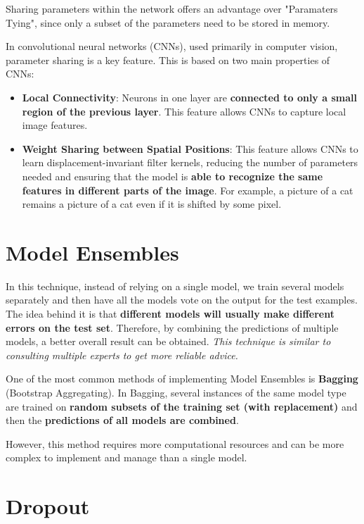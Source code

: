 Sharing parameters within the network offers an advantage over "Paramaters Tying", since only a subset of the parameters need to be stored in memory.

In convolutional neural networks (CNNs), used primarily in computer vision, parameter sharing is a key feature. This is based on two main properties of CNNs:

\begin{itemize}
    \item \textbf{Local Connectivity}: Neurons in one layer are \textbf{connected to only a small region of the previous layer}. This feature allows CNNs to capture local image features.
    \item \textbf{Weight Sharing between Spatial Positions}: This feature allows CNNs to learn displacement-invariant filter kernels, reducing the number of parameters needed and ensuring that the model is \textbf{able to recognize the same features in different parts of the image}. For example, a picture of a cat remains a picture of a cat even if it is shifted by some pixel. 
\end{itemize}

\section{Model Ensembles}

In this technique, instead of relying on a single model, we train several models separately and then have all the models vote on the output for the test examples. The idea behind it is that \textbf{different models will usually make different errors on the test set}. Therefore, by combining the predictions of multiple models, a better overall result can be obtained. \textit{This technique is similar to consulting multiple experts to get more reliable advice.}

One of the most common methods of implementing Model Ensembles is \textbf{Bagging} (Bootstrap Aggregating). In Bagging, several instances of the same model type are trained on \textbf{random subsets of the training set (with replacement)} and then the \textbf{predictions of all models are combined}. 

However, this method requires more computational resources and can be more complex to implement and manage than a single model.

\section{Dropout}

